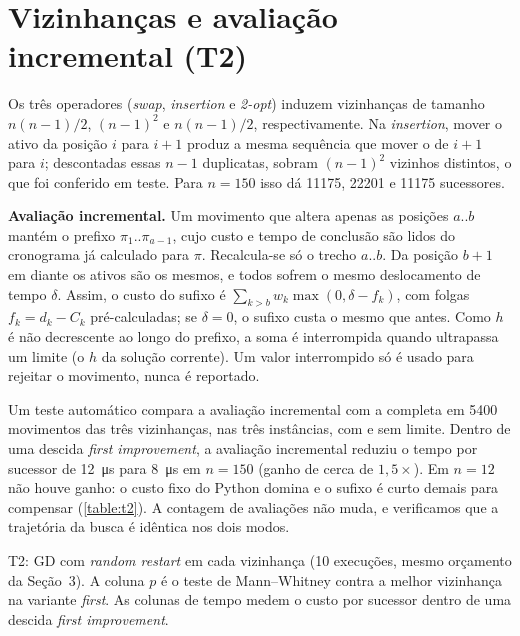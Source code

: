 \section{Vizinhanças e avaliação incremental (T2)}

Os três operadores (\textit{swap}, \textit{insertion} e \textit{2-opt})
induzem vizinhanças de tamanho $n(n-1)/2$, $(n-1)^2$ e $n(n-1)/2$,
respectivamente. Na \textit{insertion}, mover o ativo da posição $i$ para
$i+1$ produz a mesma sequência que mover o de $i+1$ para $i$; descontadas essas
$n-1$ duplicatas, sobram $(n-1)^2$ vizinhos distintos, o que foi conferido em
teste. Para $n=150$ isso dá \num{11175}, \num{22201} e \num{11175} sucessores.

\textbf{Avaliação incremental.} Um movimento que altera apenas as posições
$a..b$ mantém o prefixo $\pi_1..\pi_{a-1}$, cujo custo e tempo de conclusão
são lidos do cronograma já calculado para $\pi$. Recalcula-se só o trecho
$a..b$. Da posição $b+1$ em diante os ativos são os mesmos, e todos sofrem o
mesmo deslocamento de tempo $\delta$. Assim, o custo do sufixo é
$\sum_{k>b} w_k\max(0,\delta-f_k)$, com folgas $f_k=d_k-C_k$ pré-calculadas; se
$\delta=0$, o sufixo custa o mesmo que antes. Como $h$ é não decrescente ao
longo do prefixo, a soma é interrompida quando ultrapassa um limite (o $h$ da
solução corrente). Um valor interrompido só é usado para rejeitar o
movimento, nunca é reportado.

Um teste automático compara a avaliação incremental com a completa em
\num{5400} movimentos das três vizinhanças, nas três instâncias, com e sem
limite. Dentro de uma descida \textit{first improvement}, a avaliação
incremental reduziu o tempo por sucessor de \SI{12}{\micro\second} para
\SI{8}{\micro\second} em $n=150$ (ganho de cerca de $1{,}5\times$). Em $n=12$
não houve ganho: o custo fixo do Python domina e o sufixo é curto demais para
compensar (\autoref{table:t2}). A contagem de avaliações não muda, e
verificamos que a trajetória da busca é idêntica nos dois modos.

\begin{table}[H]
    \centering
    \caption{T2: GD com \textit{random restart} em cada vizinhança (10
    execuções, mesmo orçamento da Seção~3). A coluna $p$ é o teste de
    Mann--Whitney contra a melhor vizinhança na variante \textit{first}. As
    colunas de tempo medem o custo por sucessor dentro de uma descida
    \textit{first improvement}.}
    \label{table:t2}
    \begin{adjustbox}{max width=\linewidth}
    
    \end{adjustbox}
\end{table}

